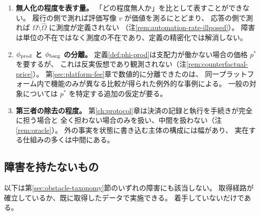 \begin{enumerate}[label=(\arabic*),start=9]
また検証できたのは演繹の正しさであって、
その演繹が現実の一人事業に当てはまるかではない（注\ref{rem:protocol-population}）。

前項(12)と同じ箇所、すなわち添字の設定に由来する制約である。

\item \textbf{無人化の程度を表す量。}
「どの程度無人か」を比として表すことができない。
履行の側で測れば評価写像 $v$ が価値を測るにとどまり、
応答の側で測れば $\Omega\setminus\hat\Omega$ に測度が定義されない
（注\ref{rem:automation-rate-illposed}）。
障害は単位の不在ではなく測度の不在であり、定義の精密化では解消しない。

\item \textbf{$\phi_{\rm prod}$ と $\phi_{\rm barg}$ の分離。}
定義\ref{def:phi-prod}は支配力が働かない場合の価格 $p^{\ast}$ を要するが、
これは反実仮想であり観測されない（注\ref{rem:counterfactual-price}）。
第\ref{sec:platform-fee}章で数値的に分離できたのは、
同一プラットフォーム内で機能のみが異なる比較が得られた例外的な事例による。
一般の対象については $p^{\ast}$ を特定する追加の仮定が要る。

\item \textbf{第三者の除去の程度。}
第\ref{ch:protocol}章は決済の記録と執行を手続きが完全に担う場合と
全く担わない場合のみを扱い、中間を扱わない（注\ref{rem:oracle}）。
外の事実を状態に書き込む主体の構成には幅があり、
実在する仕組みの多くは中間にある。
\end{enumerate}

\subsection{障害を持たないもの}

以下は第\ref{sec:obstacle-taxonomy}節のいずれの障害にも該当しない。
取得経路が確立しているか、既に取得したデータで実施できる。
着手していないだけである。

